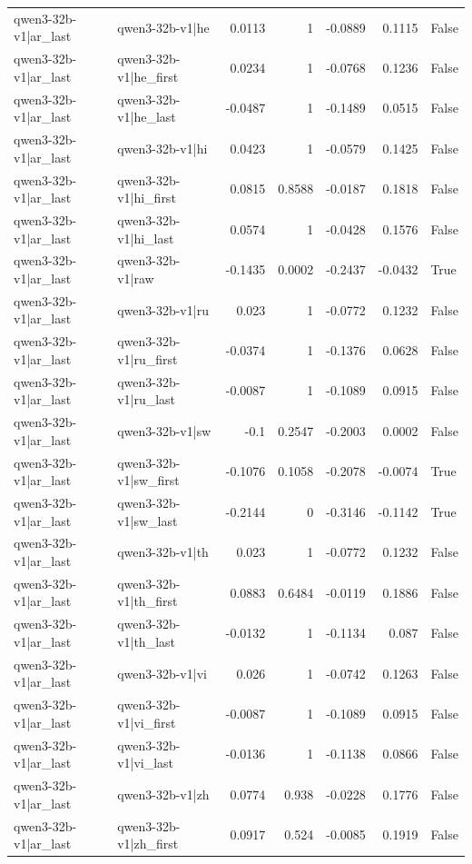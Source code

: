 \begin{table}
\begin{tabular}{l l r r r r l}
qwen3-32b-v1|ar_last & qwen3-32b-v1|he & 0.0113 & 1 & -0.0889 & 0.1115 & False \\
qwen3-32b-v1|ar_last & qwen3-32b-v1|he_first & 0.0234 & 1 & -0.0768 & 0.1236 & False \\
qwen3-32b-v1|ar_last & qwen3-32b-v1|he_last & -0.0487 & 1 & -0.1489 & 0.0515 & False \\
qwen3-32b-v1|ar_last & qwen3-32b-v1|hi & 0.0423 & 1 & -0.0579 & 0.1425 & False \\
qwen3-32b-v1|ar_last & qwen3-32b-v1|hi_first & 0.0815 & 0.8588 & -0.0187 & 0.1818 & False \\
qwen3-32b-v1|ar_last & qwen3-32b-v1|hi_last & 0.0574 & 1 & -0.0428 & 0.1576 & False \\
qwen3-32b-v1|ar_last & qwen3-32b-v1|raw & -0.1435 & 0.0002 & -0.2437 & -0.0432 & True \\
qwen3-32b-v1|ar_last & qwen3-32b-v1|ru & 0.023 & 1 & -0.0772 & 0.1232 & False \\
qwen3-32b-v1|ar_last & qwen3-32b-v1|ru_first & -0.0374 & 1 & -0.1376 & 0.0628 & False \\
qwen3-32b-v1|ar_last & qwen3-32b-v1|ru_last & -0.0087 & 1 & -0.1089 & 0.0915 & False \\
qwen3-32b-v1|ar_last & qwen3-32b-v1|sw & -0.1 & 0.2547 & -0.2003 & 0.0002 & False \\
qwen3-32b-v1|ar_last & qwen3-32b-v1|sw_first & -0.1076 & 0.1058 & -0.2078 & -0.0074 & True \\
qwen3-32b-v1|ar_last & qwen3-32b-v1|sw_last & -0.2144 & 0 & -0.3146 & -0.1142 & True \\
qwen3-32b-v1|ar_last & qwen3-32b-v1|th & 0.023 & 1 & -0.0772 & 0.1232 & False \\
qwen3-32b-v1|ar_last & qwen3-32b-v1|th_first & 0.0883 & 0.6484 & -0.0119 & 0.1886 & False \\
qwen3-32b-v1|ar_last & qwen3-32b-v1|th_last & -0.0132 & 1 & -0.1134 & 0.087 & False \\
qwen3-32b-v1|ar_last & qwen3-32b-v1|vi & 0.026 & 1 & -0.0742 & 0.1263 & False \\
qwen3-32b-v1|ar_last & qwen3-32b-v1|vi_first & -0.0087 & 1 & -0.1089 & 0.0915 & False \\
qwen3-32b-v1|ar_last & qwen3-32b-v1|vi_last & -0.0136 & 1 & -0.1138 & 0.0866 & False \\
qwen3-32b-v1|ar_last & qwen3-32b-v1|zh & 0.0774 & 0.938 & -0.0228 & 0.1776 & False \\
qwen3-32b-v1|ar_last & qwen3-32b-v1|zh_first & 0.0917 & 0.524 & -0.0085 & 0.1919 & False \\

\end{tabular}
\end{table}
